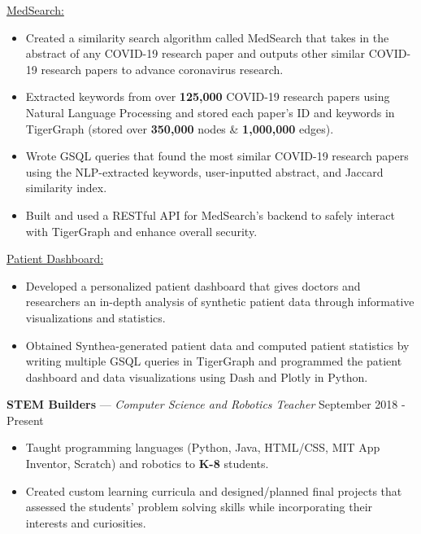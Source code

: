 \documentclass[11pt]{res}
\begin{document}
\begin{footnotesize}
\begin{resume}
\setlength{\parindent}{4ex}\underline{MedSearch:}
\vspace{-4.75mm}
\begin{itemize} \itemsep -2pt 
\item Created a similarity search algorithm called MedSearch that takes in the abstract of any COVID-19 research paper and outputs other similar COVID-19 research papers to advance coronavirus research.
\vspace{1mm}
\item Extracted keywords from over \textbf{125,000} COVID-19 research papers using Natural Language Processing and stored each paper's ID and keywords in TigerGraph (stored over \textbf{350,000} nodes \& \textbf{1,000,000} edges).
\vspace{1mm}
\item Wrote GSQL queries that found the most similar COVID-19 research papers using the NLP-extracted keywords, user-inputted abstract, and Jaccard similarity index.
\vspace{1mm}
\item Built and used a RESTful API for MedSearch's backend to safely interact with TigerGraph and enhance overall security.
\end{itemize}
\vspace{-4.5mm}

\setlength{\parindent}{4ex}\underline{Patient Dashboard:}
\vspace{-4.75mm}
\begin{itemize} \itemsep -2pt 
\item Developed a personalized patient dashboard that gives doctors and researchers an in-depth analysis of synthetic patient data through informative visualizations and statistics. 
\vspace{1mm}
\item Obtained Synthea-generated patient data and computed patient statistics by writing multiple GSQL queries in TigerGraph and programmed the patient dashboard and data visualizations using Dash and Plotly in Python.
\end{itemize}
\vspace{-2.5mm}
\textbf{STEM Builders} — {\sl Computer Science and Robotics Teacher} \hfill September 2018 - Present\vspace{-4.75mm}
\begin{itemize} \itemsep -2pt 
\item Taught programming languages (Python, Java, HTML/CSS, MIT App Inventor, Scratch) and robotics to \textbf{K-8} students. 
\vspace{1mm}
\item Created custom learning curricula and designed/planned final projects that assessed the students' problem solving skills while incorporating their interests and curiosities. 
\end{itemize}
\begin{small}

\end{small}
\end{resume}
\end{footnotesize}
\end{document}
